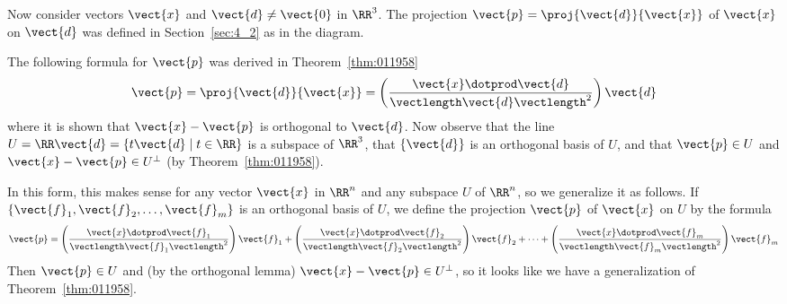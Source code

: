 Now consider vectors $\vect{x}$ and $\vect{d} \neq \vect{0}$ in $\RR^3$. The projection $\vect{p} = \proj{\vect{d}}{\vect{x}}$ of $\vect{x}$ on $\vect{d}$ was defined in Section~\ref{sec:4_2} as in the diagram.

The following formula for $\vect{p}$ was derived in Theorem~\ref{thm:011958}
\begin{equation*} 
\vect{p} = \proj{\vect{d}}{\vect{x}} = \left(\frac{\vect{x} \dotprod \vect{d}}{\vectlength\vect{d}\vectlength^2} \right)\vect{d}
\end{equation*}
where it is shown that $\vect{x} - \vect{p}$ is orthogonal to $\vect{d}$. Now observe that the line $U = \RR\vect{d} = \{t\vect{d} \mid t \in \RR\}$ is a subspace of $\RR^3$, that $\{\vect{d}\}$ is an orthogonal basis of $U$, and that $\vect{p} \in U$ and $\vect{x} - \vect{p} \in U^\perp$ (by Theorem~\ref{thm:011958}).


In this form, this makes sense for any vector $\vect{x}$ in $\RR^n$ and any subspace $U$ of $\RR^n$, so we generalize it as follows. If $\{\vect{f}_{1}, \vect{f}_{2}, \dots, \vect{f}_{m}\}$ is an orthogonal basis of $U$, we define the projection $\vect{p}$ of $\vect{x}$ on $U$ by the formula
\begin{equation} \label{projPofXonUeq}
\vect{p} = \left(\frac{\vect{x} \dotprod \vect{f}_{1}}{\vectlength \vect{f}_{1} \vectlength^2}\right)\vect{f}_{1} + \left(\frac{\vect{x} \dotprod \vect{f}_{2}}{\vectlength \vect{f}_{2} \vectlength^2}\right)\vect{f}_{2}+ \dots +\left(\frac{\vect{x} \dotprod \vect{f}_{m}}{\vectlength \vect{f}_{m} \vectlength^2}\right)\vect{f}_{m}
\end{equation}
Then $\vect{p} \in U$ and (by the orthogonal lemma) $\vect{x} - \vect{p} \in U^\perp$, so it looks like we have a generalization of Theorem~\ref{thm:011958}. 


